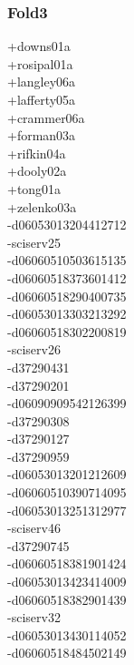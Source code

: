 \begin{multicols}{4}
\subsubsection*{Fold3}
+downs01a\\
+rosipal01a\\
+langley06a\\
+lafferty05a\\
+crammer06a\\
+forman03a\\
+rifkin04a\\
+dooly02a\\
+tong01a\\
+zelenko03a\\
-d06053013204412712\\
-sciserv25\\
-d06060510503615135\\
-d06060518373601412\\
-d06060518290400735\\
-d06053013303213292\\
-d06060518302200819\\
-sciserv26\\
-d37290431\\
-d37290201\\
-d06090909542126399\\
-d37290308\\
-d37290127\\
-d37290959\\
-d06053013201212609\\
-d06060510390714095\\
-d06053013251312977\\
-sciserv46\\
-d37290745\\
-d06060518381901424\\
-d06053013423414009\\
-d06060518382901439\\
-sciserv32\\
-d06053013430114052\\
-d06060518484502149\\

\end{multicols}
